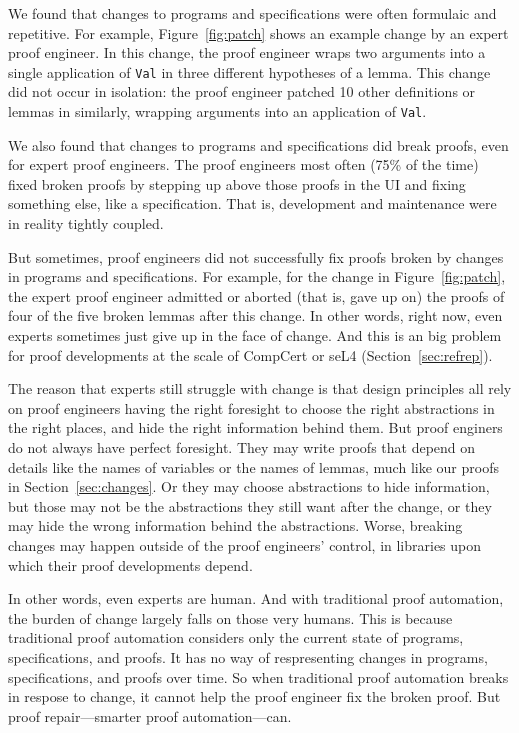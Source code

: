 We found that changes to programs and specifications were often formulaic and repetitive.
For example, Figure~\ref{fig:patch} shows an example change by an expert proof engineer.
In this change, the proof engineer wraps two arguments into a single application of \lstinline{Val}
in three different hypotheses of a lemma.
This change did not occur in isolation: the proof engineer patched 10 other definitions or lemmas
in similarly, wrapping arguments into an application of
\lstinline{Val}.

We also found that changes to programs and specifications did break proofs, even for expert proof engineers.
The proof engineers most often (75\% of the time) fixed broken proofs by stepping 
up above those proofs in the UI and fixing something else, like a specification.
That is, development and maintenance were in reality tightly coupled.

But sometimes, proof engineers did not successfully fix proofs broken by changes in programs and specifications.
For example, for the change in Figure~\ref{fig:patch},
the expert proof engineer admitted or aborted (that is, gave up on) the proofs of four of the five
broken lemmas after this change.
In other words, right now, even experts sometimes just give up in the face of change.
And this is an big problem for proof developments
at the scale of CompCert or seL4 (Section~\ref{sec:refrep}).

The reason that experts still struggle with change is that
design principles all rely on proof engineers having the right foresight to choose the 
right abstractions in the right places, and hide the right information behind them.
But proof enginers do not always have perfect foresight.
They may write proofs that depend on details like the names of variables or the names of lemmas,
much like our proofs in Section~\ref{sec:changes}.
Or they may choose abstractions to hide information, but those may not be the abstractions they still want after the change,
or they may hide the wrong information behind the abstractions.
Worse, breaking changes may happen outside of the proof engineers' control,
in libraries upon which their proof developments depend.

In other words, even experts are human.
And with traditional proof automation, the burden of change largely falls on those very humans.
This is because traditional proof automation considers only the current state of programs, specifications, and proofs.
It has no way of respresenting changes in programs, specifications, and proofs over time.
So when traditional proof automation breaks in respose to change, it cannot help the proof engineer fix the broken proof.
But proof repair---smarter proof automation---can.


